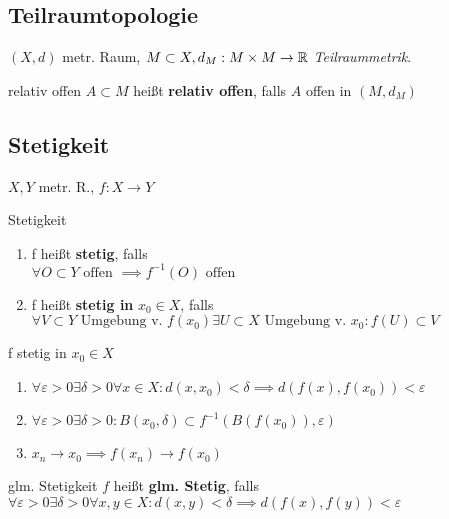 \subsection{Teilraumtopologie}
$(X,d)$ metr. Raum, ${M \subset X, d_M:M\times M \to \mathbb{R}}$
\textit{Teilraummetrik}.

\begin{definition}{relativ offen}
  $A \subset M$ heißt \textbf{relativ offen}, falls $A$ offen in $(M,d_M)$
\end{definition}



\subsection{Stetigkeit}

$X,Y$ metr. R., $f:X\to Y$\\
\begin{definition}{Stetigkeit}
  \begin{enumerate}[label = (\arabic*)]
    \item  f heißt \textbf{stetig}, falls\\
      $\forall O \subset Y \text{ offen } \implies f^{-1}(O) \text{ offen }$
    \item f heißt \textbf{stetig in} $x_0 \in X$, falls\\
      $\forall V \subset Y \text{ Umgebung v. } f(x_0) \exists
      U \subset X \text{ Umgebung v. } x_0: f(U) \subset V$
  \end{enumerate}
\end{definition}

\begin{bemerkung}
  f stetig in $x_0 \in X$
  \begin{enumerate}[label= $\Leftrightarrow$]
    \item $\forall \varepsilon >0 \exists \delta >0 \forall x \in X:
      d(x,x_0)<\delta \implies d(f(x),f(x_0)) < \varepsilon$
    \item $\forall \varepsilon >0 \exists \delta >0:
      B(x_0,\delta) \subset f^{-1}(B(f(x_0)), \varepsilon)$
    \item $x_n \to x_0 \implies f(x_n) \to f(x_0)$
  \end{enumerate}
\end{bemerkung}

\begin{definition}{glm. Stetigkeit}
  $f$ heißt \textbf{glm. Stetig}, falls
  $\forall \varepsilon >0 \exists \delta >0 \forall x,y \in X:
  d(x,y) < \delta \implies d(f(x),f(y)) < \varepsilon$
\end{definition}

